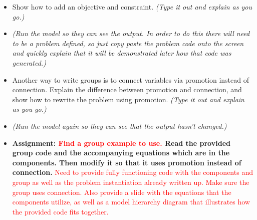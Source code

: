 \documentclass[12pt, letterpaper]{article}
\begin{document}
\begin{itemize}
\begin{itemize}
			\item Show how to add an objective and constraint. \textit{(Type it out and explain as you go.)}
			\item \textit{(Run the model so they can see the output. In order to do this there will need to be a problem defined, so just copy paste the 				problem code onto the screen and quickly explain that it will be demonstrated later how that code was generated.)}
			\item Another way to write groups is to connect variables via promotion instead of connection. Explain the difference between promotion 					and connection, and show how to rewrite the problem using promotion. \textit{(Type it out and explain as you go.)}
			\item \textit{(Run the model again so they can see that the output hasn’t changed.)}
			\item \textbf{Assignment: \textcolor{red}{Find a group example to use.} Read the provided group code and the accompanying equations which are in the components. Then modify it so that it uses promotion instead of connection.} \textcolor{red}{Need to provide fully functioning code with the components and group as well as the problem instantiation already written up. Make sure the group uses connection. Also provide a slide with the equations that the components utilize, as well as a model hierarchy diagram that illustrates how the provided code fits together.}
		\end{itemize}
		

\end{itemize}
\end{document}
